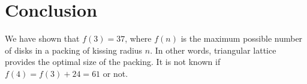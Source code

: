 \begin{enumerate}[label={\bf Case \arabic*: }, wide, labelwidth=!, labelindent=0pt]





\end{enumerate}

\section{Conclusion}

We have shown that $f(3) = 37$, where $f(n)$ is the maximum possible number of disks in a packing of kissing radius $n$. In other words, triangular lattice provides the optimal size of the packing. It is not known if $f(4) = f(3) + 24 = 61$ or not.



